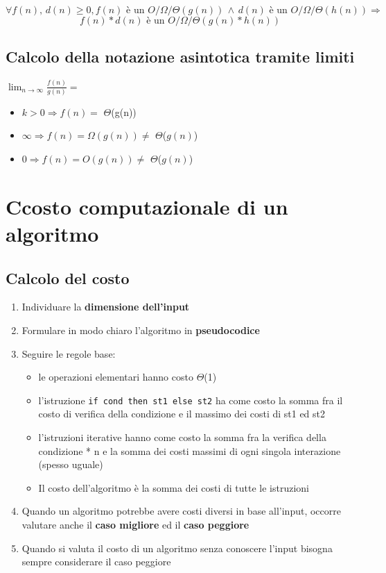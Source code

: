 \documentclass{report}
\newcommand{\T}[1]{$\Theta$(#1)}
\begin{document}
        $$\forall f\left(n\right), \, d\left(n\right) \geq 0, f\left(n\right) \textrm{ è un }
            O/\Omega/\Theta\left(g\left(n\right)\right) \, \wedge \, d\left(n\right) \textrm{ è un }
            O/\Omega/\Theta\left(h\left(n\right)\right) \Longrightarrow$$
        $$f\left(n\right) * d\left(n\right) \textrm{ è un } 
            O/\Omega/\Theta\left(g\left(n\right) * h\left(n\right)\right)$$
    \subsection{Calcolo della notazione asintotica tramite limiti}
        $\lim_{n \to \infty}\frac{f\left(n\right)}{g\left(n\right)} =$
        \begin{itemize}
            \item $k > 0 \Longrightarrow f\left(n\right) = $ \T{g(n)}
            \item $\infty \Longrightarrow f\left(n\right) = \Omega\left(g\left(n\right)\right)
                \neq$ \T{$g\left(n\right)$}
            \item $0 \Longrightarrow f\left(n\right) = O\left(g\left(n\right)\right)
                \neq$ \T{$g\left(n\right)$}
        \end{itemize}
\section{Ccosto computazionale di un algoritmo}
    \subsection{Calcolo del costo}
    \begin{enumerate}
        \item Individuare la \textbf{dimensione dell'input}
        \item Formulare in modo chiaro l'algoritmo in \textbf{pseudocodice}
        \item Seguire le regole base:
            \begin{itemize}
                \item le operazioni elementari hanno costo \T{1}
                \item l'istruzione \verb|if cond then st1 else st2| ha come costo
                    la somma fra il costo di verifica della condizione e il massimo dei
                    costi di st1 ed st2
                \item l'istruzioni iterative hanno come costo la somma fra la verifica 
                    della condizione * n e la somma dei costi massimi di ogni singola 
                    interazione (spesso uguale)
                \item Il costo dell'algoritmo è la somma dei costi di tutte le istruzioni
            \end{itemize}
        \item Quando un algoritmo potrebbe avere costi diversi in base all'input, occorre
            valutare anche il \textbf{caso migliore} ed il \textbf{caso peggiore}
        \item Quando si valuta il costo di un algoritmo senza conoscere l'input
            bisogna sempre considerare il caso peggiore
    \end{enumerate}
\end{document}

